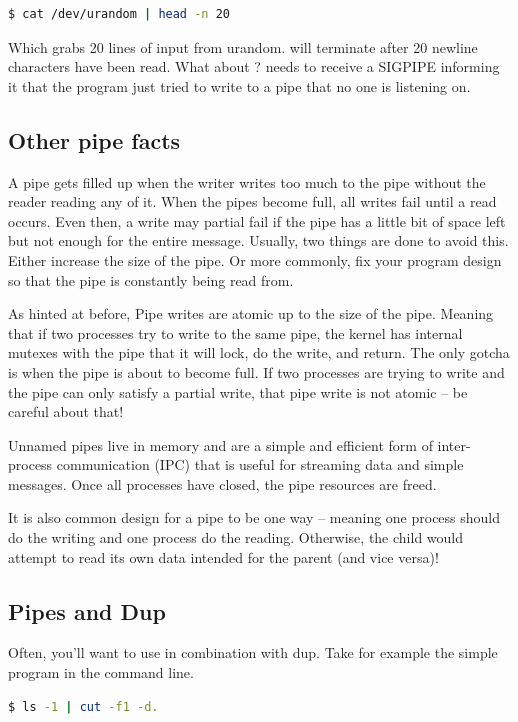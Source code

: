 \begin{lstlisting}[language=bash]
$ cat /dev/urandom | head -n 20
\end{lstlisting}
Which grabs 20 lines of input from urandom.  will terminate after 20 newline characters have been read.
What about ?
 needs to receive a SIGPIPE informing it that the program just tried to write to a pipe that no one is listening on.

\subsection{Other pipe facts}

A pipe gets filled up when the writer writes too much to the pipe without the reader reading any of it. When the pipes become full, all writes fail until a read occurs. Even then, a write may partial fail if the pipe has a little bit of space left but not enough for the entire message. Usually, two things are done to avoid this. Either increase the size of the pipe. Or more commonly, fix your program design so that the pipe is constantly being read from.

As hinted at before, Pipe writes are atomic up to the size of the pipe. Meaning that if two processes try to write to the same pipe, the kernel has internal mutexes with the pipe that it will lock, do the write, and return. The only gotcha is when the pipe is about to become full. If two processes are trying to write and the pipe can only satisfy a partial write, that pipe write is not atomic -- be careful about that!

Unnamed pipes live in memory and are a simple and efficient form of inter-process communication (IPC) that is useful for streaming data and simple messages. Once all processes have closed, the pipe resources are freed.

It is also common design for a pipe to be one way -- meaning one process should do the writing and one process do the reading. Otherwise, the child would attempt to read its own data intended for the parent (and vice versa)!

\subsection{Pipes and Dup}

Often, you'll want to use  in combination with dup.
Take for example the simple program in the command line.

\begin{lstlisting}[language=bash]
$ ls -1 | cut -f1 -d.
\end{lstlisting}


